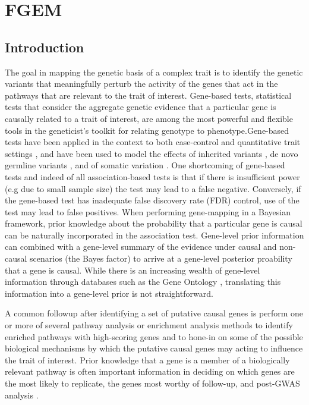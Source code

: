 
\chapter{FGEM}




\section{Introduction}\label{sec:org28fe636}

The goal in mapping the genetic basis of a complex trait is to identify the genetic variants that meaningfully perturb the activity of the genes that act in the pathways that are relevant to the trait of interest.  Gene-based tests, statistical tests that consider the aggregate genetic evidence that a particular gene is causally related to a trait of interest, are among the most powerful and flexible tools in the geneticist's toolkit for relating genotype to phenotype.Gene-based tests have been applied in the context to both case-control \cite{skat} and  quantitative trait settings \cite{predixcan}, and have been used to model the effects of inherited variants \cite{skat}, de novo germline variants \cite{TADA}, and of somatic variation \cite{drivermaps}.  One shortcoming of gene-based tests and indeed of all association-based tests is that if there is insufficient power (e.g due to small sample size) the test may lead to a false negative.  Conversely, if the gene-based test has inadequate false discovery rate (FDR) control, use of the test may lead to false positives. When performing gene-mapping in a Bayesian framework, prior knowledge about the probability that a particular gene is causal can be naturally incorporated in the association test.  Gene-level prior information can combined with a gene-level summary of the evidence under causal and non-causal scenarios (the Bayes factor) to arrive at a gene-level posterior proability that a gene is causal.  While there is an increasing wealth of gene-level information through databases such as the Gene Ontology \cite{GO}, translating this information into a gene-level prior is not straightforward.

A common followup after identifying a set of putative causal genes is perform one or more of several pathway analysis or enrichment analysis methods \cite{rss-e} \cite{Carbonetto_2013} \cite{Lamparter_2016} to identify enriched pathways with high-scoring genes and to hone-in on some of the possible biological mechanisms by which the putative causal genes may acting to influence the trait of interest. Prior knowledge that a gene is a member of a biologically relevant pathway is often important information in deciding on which genes are the most likely to replicate, the genes most worthy of follow-up, and post-GWAS analysis \cite{Hou_2013}.

